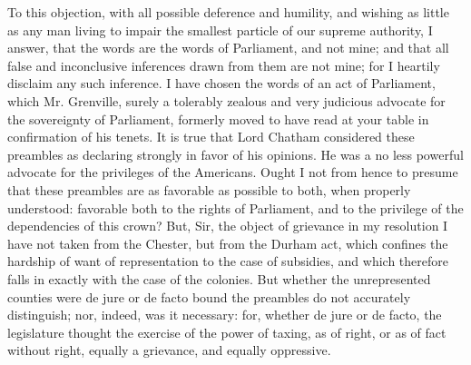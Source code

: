 To this objection, with all possible deference and humility, and wishing as little as any man living to impair the smallest particle of our supreme authority, I answer, that the words are the words of Parliament, and not mine; and that all false and inconclusive inferences drawn from them are not mine; for I heartily disclaim any such inference. I have chosen the words of an act of Parliament, which Mr. Grenville, surely a tolerably zealous and very judicious advocate for the sovereignty of Parliament, formerly moved to have read at your table in confirmation of his tenets. It is true that Lord Chatham considered these preambles as declaring strongly in favor of his opinions. He was a no less powerful advocate for the privileges of the Americans. Ought I not from hence to presume that these preambles are as favorable as possible to both, when properly understood: favorable both to the rights of Parliament, and to the privilege of the dependencies of this crown? But, Sir, the object of grievance in my resolution I have not taken from the Chester, but from the Durham act, which confines the hardship of want of representation to the case of subsidies, and which therefore falls in exactly with the case of the colonies. But whether the unrepresented counties were de jure or de facto bound the preambles do not accurately distinguish; nor, indeed, was it necessary: for, whether de jure or de facto, the legislature thought the exercise of the power of taxing, as of right, or as of fact without right, equally a grievance, and equally oppressive.

